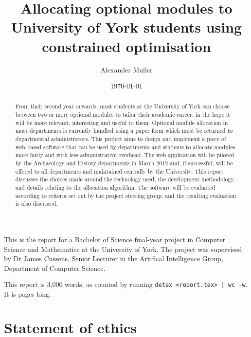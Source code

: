 \documentclass[]{scrartcl}
\title{Allocating optional modules to University of York students using constrained optimisation}
\author{Alexander Muller}
\date{\today}
\begin{document}
\ifpdf
{}
\else
{}
\fi

\maketitle

This is the report for a Bachelor of Science final-year project in Computer
Science and Mathematics at the University of York. The project was supervised
by Dr James Cussens, Senior Lecturer in the Artifical Intelligence Group,
Department of Computer Science.

This report is 3,000 words, as counted by running \texttt{detex <report.tex> |
wc -w}. It is \pageref{LastPage} pages long.


\newpage

\begin{abstract}
  From their second year onwards, most students at the University of York can
  choose between two or more optional modules to tailor their academic career,
  in the hope it will be more relevant, interesting and useful to them.
  Optional module allocation in most departments is currently handled using a
  paper form which must be returned to departmental administrators. This project
  aims to design and implement a piece of web-based software that can be used by
  departments and students to allocate modules more fairly and with less
  administrative overhead.
  The web application will be piloted by the Archaeology and History departments
  in March 2012 and, if successful, will be offered to all departments and
  maintained centrally by the University.
  This report discusses the choices made around the technology used, the
  development methodology and details relating to the allocation algorithm.
  The software will be evaluated according to criteria set out by the project
  steering group, and the resulting evaluation is also discussed.
\end{abstract}

\newpage

\tableofcontents

\newpage

\section{Statement of ethics}
\end{document}
